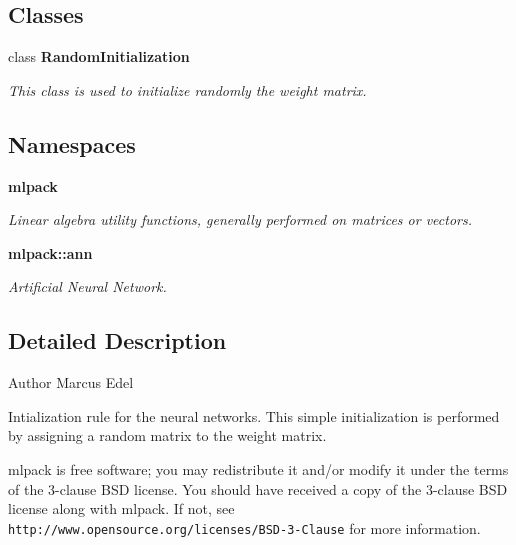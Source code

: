 \subsection*{Classes}
\begin{DoxyCompactItemize}
\item 
class \textbf{ Random\+Initialization}
\begin{DoxyCompactList}\small\item\em This class is used to initialize randomly the weight matrix. \end{DoxyCompactList}\end{DoxyCompactItemize}
\subsection*{Namespaces}
\begin{DoxyCompactItemize}
\item 
 \textbf{ mlpack}
\begin{DoxyCompactList}\small\item\em Linear algebra utility functions, generally performed on matrices or vectors. \end{DoxyCompactList}\item 
 \textbf{ mlpack\+::ann}
\begin{DoxyCompactList}\small\item\em Artificial Neural Network. \end{DoxyCompactList}\end{DoxyCompactItemize}


\subsection{Detailed Description}
\begin{DoxyAuthor}{Author}
Marcus Edel
\end{DoxyAuthor}
Intialization rule for the neural networks. This simple initialization is performed by assigning a random matrix to the weight matrix.

mlpack is free software; you may redistribute it and/or modify it under the terms of the 3-\/clause B\+SD license. You should have received a copy of the 3-\/clause B\+SD license along with mlpack. If not, see {\tt http\+://www.\+opensource.\+org/licenses/\+B\+S\+D-\/3-\/\+Clause} for more information. 